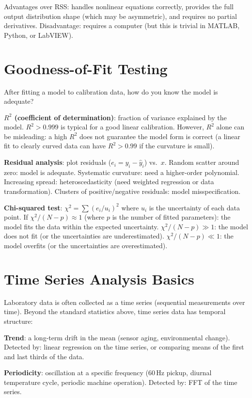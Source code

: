 \documentclass[11pt,letterpaper,twoside,openany]{book}
\begin{document}
Advantages over RSS: handles nonlinear equations correctly, provides the full output distribution shape (which may be asymmetric), and requires no partial derivatives. Disadvantage: requires a computer (but this is trivial in MATLAB, Python, or LabVIEW).

\section{Goodness-of-Fit Testing}
After fitting a model to calibration data, how do you know the model is adequate?

\textbf{$R^2$ (coefficient of determination)}: fraction of variance explained by the model. $R^2 > 0.999$ is typical for a good linear calibration. However, $R^2$ alone can be misleading: a high $R^2$ does not guarantee the model form is correct (a linear fit to clearly curved data can have $R^2 > 0.99$ if the curvature is small).

\textbf{Residual analysis}: plot residuals ($e_i = y_i - \hat{y}_i$) vs.\ $x$. Random scatter around zero: model is adequate. Systematic curvature: need a higher-order polynomial. Increasing spread: heteroscedasticity (need weighted regression or data transformation). Clusters of positive/negative residuals: model misspecification.

\textbf{Chi-squared test}: $\chi^2 = \sum(e_i/u_i)^2$ where $u_i$ is the uncertainty of each data point. If $\chi^2/(N-p) \approx 1$ (where $p$ is the number of fitted parameters): the model fits the data within the expected uncertainty. $\chi^2/(N-p) \gg 1$: the model does not fit (or the uncertainties are underestimated). $\chi^2/(N-p) \ll 1$: the model overfits (or the uncertainties are overestimated).

\section{Time Series Analysis Basics}
Laboratory data is often collected as a time series (sequential measurements over time). Beyond the standard statistics above, time series data has temporal structure:

\textbf{Trend}: a long-term drift in the mean (sensor aging, environmental change). Detected by: linear regression on the time series, or comparing means of the first and last thirds of the data.

\textbf{Periodicity}: oscillation at a specific frequency (60\,Hz pickup, diurnal temperature cycle, periodic machine operation). Detected by: FFT of the time series.
\end{document}
